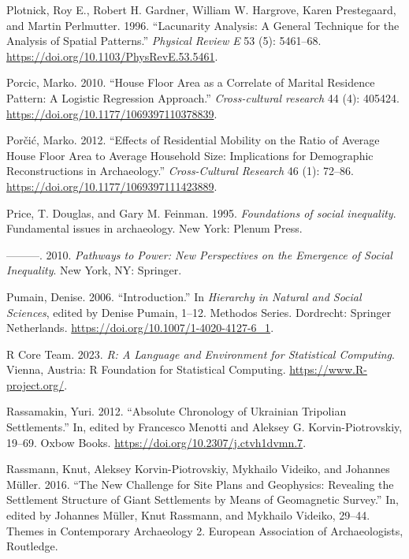 \documentclass[
  12pt,
  a4paper, twoside]{book}
\newlength{\cslhangindent}
\newlength{\cslentryspacingunit} %
\newenvironment{CSLReferences}[2] %
 {%
  \setlength{\parindent}{0pt}
  \ifodd #1
  \let\oldpar\par
  \def\par{\hangindent=\cslhangindent\oldpar}
  \fi
  \setlength{\parskip}{#2\cslentryspacingunit}
 }%
 {}
\begin{document}
\begin{CSLReferences}{1}{0}
\leavevmode{}%
Plotnick, Roy E., Robert H. Gardner, William W. Hargrove, Karen Prestegaard, and Martin Perlmutter. 1996. {``Lacunarity Analysis: A General Technique for the Analysis of Spatial Patterns.''} \emph{Physical Review E} 53 (5): 5461--68. \url{https://doi.org/10.1103/PhysRevE.53.5461}.

\leavevmode{}%
Porcic, Marko. 2010. {``House Floor Area as a Correlate of Marital Residence Pattern: A Logistic Regression Approach.''} \emph{Cross-cultural research} 44 (4): 405424. \url{https://doi.org/10.1177/1069397110378839}.

\leavevmode{}%
Porčić, Marko. 2012. {``Effects of Residential Mobility on the Ratio of Average House Floor Area to Average Household Size: Implications for Demographic Reconstructions in Archaeology.''} \emph{Cross-Cultural Research} 46 (1): 72--86. \url{https://doi.org/10.1177/1069397111423889}.

\leavevmode{}%
Price, T. Douglas, and Gary M. Feinman. 1995. \emph{Foundations of social inequality}. Fundamental issues in archaeology. New York: Plenum Press.

\leavevmode{}%
---------. 2010. \emph{Pathways to Power: New Perspectives on the Emergence of Social Inequality}. New York, NY: Springer.

\leavevmode{}%
Pumain, Denise. 2006. {``Introduction.''} In \emph{Hierarchy in {Natural} and {Social Sciences}}, edited by Denise Pumain, 1--12. Methodos {Series}. {Dordrecht}: {Springer Netherlands}. \url{https://doi.org/10.1007/1-4020-4127-6_1}.

\leavevmode{}%
R Core Team. 2023. \emph{R: A Language and Environment for Statistical Computing}. Vienna, Austria: R Foundation for Statistical Computing. \url{https://www.R-project.org/}.

\leavevmode{}%
Rassamakin, Yuri. 2012. {``Absolute Chronology of Ukrainian Tripolian Settlements.''} In, edited by Francesco Menotti and Aleksey G. Korvin-Piotrovskiy, 19--69. Oxbow Books. \url{https://doi.org/10.2307/j.ctvh1dvmn.7}.

\leavevmode{}%
Rassmann, Knut, Aleksey Korvin-Piotrovskiy, Mykhailo Videiko, and Johannes Müller. 2016. {``The New Challenge for Site Plans and Geophysics: Revealing the Settlement Structure of Giant Settlements by Means of Geomagnetic Survey.''} In, edited by Johannes Müller, Knut Rassmann, and Mykhailo Videiko, 29--44. Themes in Contemporary Archaeology 2. European Association of Archaeologists, Routledge.


\end{CSLReferences}
\end{document}
